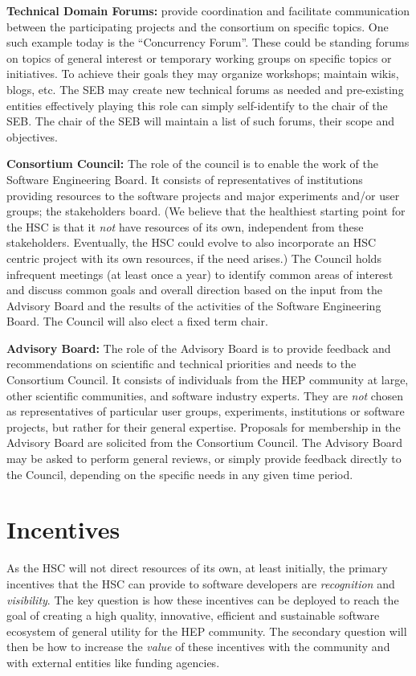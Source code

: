 \documentclass[12pt,letterpaper,fleqn]{article}
\begin{document}
{\bf Technical Domain Forums:} provide coordination and facilitate
communication between the participating projects and the consortium
on specific topics. One such example today is the ``Concurrency Forum''.
These could be standing forums on topics of general interest or
temporary working groups on specific topics or initiatives.
To achieve their goals they may organize workshops; maintain wikis,
blogs, etc. The SEB may create new technical forums as needed and pre-existing entities effectively playing this role can simply self-identify
to the chair of the SEB. The chair of the SEB will maintain a list
of such forums, their scope and objectives.

{\bf Consortium Council:} The role of the council is to enable the
work of the Software Engineering Board.
It consists of representatives of
institutions providing resources to the software projects
and major experiments and/or user groups; the stakeholders board.
(We believe that the healthiest starting point
for the HSC is that it {\em not} have resources of its own, independent
from these stakeholders.  Eventually,
the HSC could evolve to also incorporate an HSC centric project with its own resources, if the need arises.)  
The Council holds infrequent meetings (at least once a year) to 
identify common areas of interest and discuss common goals and overall
direction based on the input from the Advisory Board and the results of the activities of the Software Engineering Board. The Council will
also elect a fixed term chair. 

{\bf Advisory Board:} The role of the Advisory Board is to provide
feedback and recommendations on scientific and technical priorities
and needs to the Consortium Council. It consists of individuals from
the HEP community at large, other scientific communities, and
software industry experts. They are {\em not} chosen as representatives
of particular user groups, experiments, institutions or software
projects, but rather for their general expertise.
Proposals for membership in the Advisory Board are solicited from the Consortium Council. The Advisory Board may be asked to perform general
reviews, or simply provide feedback directly to the Council, depending
on the specific needs in any given time period. 


\section{Incentives}

As the HSC will not direct resources of its own, at least initially,
the primary incentives that the HSC can provide to software developers are {\em recognition}
and {\em visibility}. The key question is how these incentives can be 
deployed to reach the goal of creating a high quality, innovative, 
efficient and sustainable software ecosystem of general utility for the 
HEP community. The secondary question will then be how to increase 
the {\em value} of these incentives with the community and with external 
entities like funding agencies.
\end{document}

